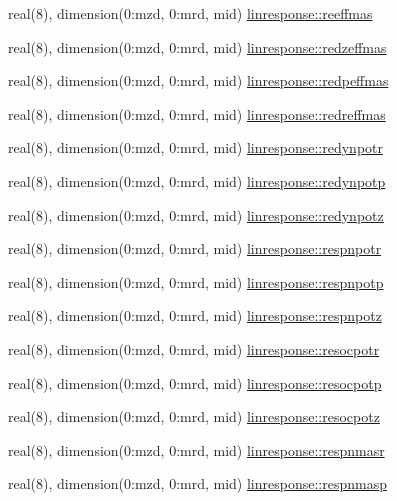 \begin{DoxyCompactItemize}
\item 
real(8), dimension(0\+:mzd, 0\+:mrd, mid) \hyperlink{namespacelinresponse_ac1957d236baef96b56777286e9f3c73d}{linresponse\+::reeffmas}
\item 
real(8), dimension(0\+:mzd, 0\+:mrd, mid) \hyperlink{namespacelinresponse_a82e00a40d4e7b9da38b7ed863b478a46}{linresponse\+::redzeffmas}
\item 
real(8), dimension(0\+:mzd, 0\+:mrd, mid) \hyperlink{namespacelinresponse_a9373ae4e61b4f56aaf1bdda2220b6b84}{linresponse\+::redpeffmas}
\item 
real(8), dimension(0\+:mzd, 0\+:mrd, mid) \hyperlink{namespacelinresponse_ac3dcec490760355090db4449f07af242}{linresponse\+::redreffmas}
\item 
real(8), dimension(0\+:mzd, 0\+:mrd, mid) \hyperlink{namespacelinresponse_ae59e7071c07822fe6f42ccb65f7a5499}{linresponse\+::redynpotr}
\item 
real(8), dimension(0\+:mzd, 0\+:mrd, mid) \hyperlink{namespacelinresponse_ac97c3f520c6a3ed7951b9ea89c708dea}{linresponse\+::redynpotp}
\item 
real(8), dimension(0\+:mzd, 0\+:mrd, mid) \hyperlink{namespacelinresponse_aa7199bd4aef0d3b4b9ac19113dff05c3}{linresponse\+::redynpotz}
\item 
real(8), dimension(0\+:mzd, 0\+:mrd, mid) \hyperlink{namespacelinresponse_af35c667771d04682427a36b449a93e4e}{linresponse\+::respnpotr}
\item 
real(8), dimension(0\+:mzd, 0\+:mrd, mid) \hyperlink{namespacelinresponse_a93306d7c4ba88c016a861358c2b5490d}{linresponse\+::respnpotp}
\item 
real(8), dimension(0\+:mzd, 0\+:mrd, mid) \hyperlink{namespacelinresponse_a9d605b10ad61f70040cc25d4ca6448c1}{linresponse\+::respnpotz}
\item 
real(8), dimension(0\+:mzd, 0\+:mrd, mid) \hyperlink{namespacelinresponse_a558d85c10979647eb804dba312a1bd0b}{linresponse\+::resocpotr}
\item 
real(8), dimension(0\+:mzd, 0\+:mrd, mid) \hyperlink{namespacelinresponse_a1b6fa600d56bf0d7b77d07f171dc7793}{linresponse\+::resocpotp}
\item 
real(8), dimension(0\+:mzd, 0\+:mrd, mid) \hyperlink{namespacelinresponse_add1bf214d7e350a1a9d5fdf77bcddb1e}{linresponse\+::resocpotz}
\item 
real(8), dimension(0\+:mzd, 0\+:mrd, mid) \hyperlink{namespacelinresponse_a69c41279cfccb9280ec0c0f09982b4e0}{linresponse\+::respnmasr}
\item 
real(8), dimension(0\+:mzd, 0\+:mrd, mid) \hyperlink{namespacelinresponse_a9ca153f1f704fd51d0dd27aa1a2960c2}{linresponse\+::respnmasp}

\end{DoxyCompactItemize}
